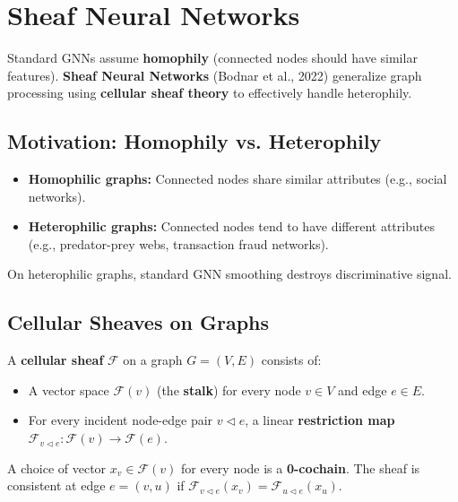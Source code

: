\documentclass[12pt,a4paper]{article}
\begin{document}
\vspace{0.5cm}

\section{Sheaf Neural Networks}

Standard GNNs assume \textbf{homophily} (connected nodes should have similar features). \textbf{Sheaf Neural Networks} (Bodnar et al., 2022) generalize graph processing using \textbf{cellular sheaf theory} to effectively handle heterophily.

\subsection{Motivation: Homophily vs. Heterophily}

\begin{itemize}
    \item \textbf{Homophilic graphs:} Connected nodes share similar attributes (e.g., social networks).
    \item \textbf{Heterophilic graphs:} Connected nodes tend to have different attributes (e.g., predator-prey webs, transaction fraud networks).
\end{itemize}

On heterophilic graphs, standard GNN smoothing destroys discriminative signal.

\subsection{Cellular Sheaves on Graphs}

\begin{definition}
A \textbf{cellular sheaf} $\mathcal{F}$ on a graph $G=(V,E)$ consists of:
\begin{itemize}
    \item A vector space $\mathcal{F}(v)$ (the \textbf{stalk}) for every node $v \in V$ and edge $e \in E$.
    \item For every incident node-edge pair $v \triangleleft e$, a linear \textbf{restriction map} $\mathcal{F}_{v \triangleleft e}: \mathcal{F}(v) \to \mathcal{F}(e)$.
\end{itemize}
A choice of vector $x_v \in \mathcal{F}(v)$ for every node is a \textbf{0-cochain}. The sheaf is consistent at edge $e = (v,u)$ if $\mathcal{F}_{v \triangleleft e}(x_v) = \mathcal{F}_{u \triangleleft e}(x_u)$.
\end{definition}
\end{document}
